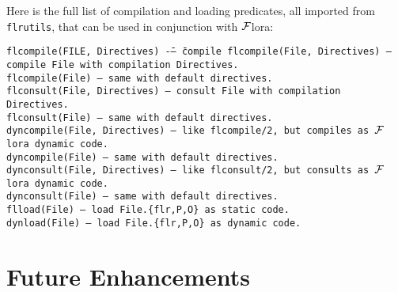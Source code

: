 \documentclass[11pt]{article}
\newcommand{\FLORA}{{\mbox{${\cal F}${\sc lora}}}\xspace}
\begin{document}
Here is the full list of compilation and loading predicates, all imported
from {\tt flrutils}, that can be used in conjunction with \FLORA:
\begin{tabbing}
 \tt flcompile(FILE, Directives)  \= ---- \= compile\kill
 \tt flcompile(File, Directives) \> -- \> compile File with compilation Directives.\\
 \tt flcompile(File) \> -- \> same with default directives.\\
 \tt flconsult(File, Directives) \> -- \> consult File with compilation Directives.\\
 \tt flconsult(File) \> -- \> same with default directives.\\
 \tt dyncompile(File, Directives) \> -- \> like flcompile/2, but compiles
 as \FLORA dynamic code.\\
 \tt dyncompile(File) \> -- \> same with default directives.\\
 \tt dynconsult(File, Directives) \> -- \> like flconsult/2, but consults
 as \FLORA dynamic code.\\
 \tt dynconsult(File) \> -- \> same with default directives.\\
 \tt flload(File) \> -- \> load File.\{flr,P,O\} as static code.\\
 \tt dynload(File) \> -- \> load File.\{flr,P,O\} as dynamic code.\\
\end{tabbing}

\section{Future Enhancements}
\end{document}
